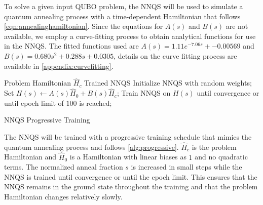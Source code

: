 To solve a given input QUBO problem, the NNQS will be used to simulate a quantum annealing process with a time-dependent Hamiltonian that follows \autoref{eqn:annealinghamiltonian}. Since the equations for $A(s)$ and $B(s)$ are not available, we employ a curve-fitting process to obtain analytical functions for use in the NNQS. The fitted functions used are $A(s) = 1.11e^{-7.06s} + -0.00569$ and $B(s)= 0.680s^2 + 0.288s + 0.0305$, details on the curve fitting process are available in \autoref{appendix:curvefitting}.

\begin{algorithm}
    \begin{algorithmic}
    \Require Problem Hamiltonian $\hat{H}_c$
    \Ensure Trained NNQS
    \State Initialize NNQS with random weights;
    \State Set $H(s) \leftarrow A(s)\hat{H}_0 + B(s)\hat{H}_c$;
    \State Train NNQS on $H(s)$ until convergence or until epoch limit of $100$ is reached;
    \EndFor
    \end{algorithmic}
    \caption{NNQS Progressive Training}
    \label{alg:progressive}
\end{algorithm}

The NNQS will be trained with a progressive training schedule that mimics the quantum annealing process and follows \autoref{alg:progressive}. $\hat{H}_c$ is the problem Hamiltonian and $\hat{H}_0$ is a Hamiltonian with linear biases as $1$ and no quadratic terms. The normalized anneal fraction $s$ is increased in small steps while the NNQS is trained until convergence or until the epoch limit. This ensures that the NNQS remains in the ground state throughout the training and that the problem Hamiltonian changes relatively slowly. 

